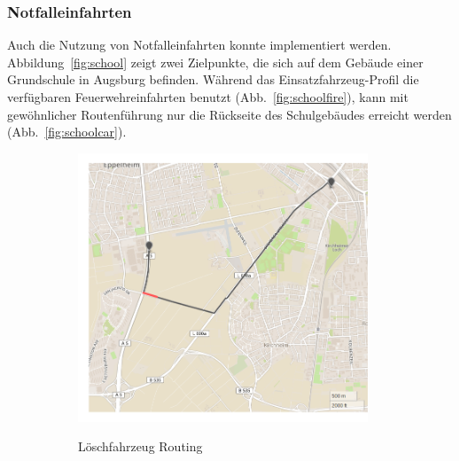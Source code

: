 \subsubsection{Notfalleinfahrten}


Auch die Nutzung von Notfalleinfahrten konnte implementiert werden.
Abbildung~\ref{fig:school} zeigt zwei Zielpunkte, die sich auf dem Gebäude einer Grundschule in Augsburg befinden. 
Während das Einsatzfahrzeug-Profil die verfügbaren Feuerwehreinfahrten benutzt (Abb.~\ref{fig:schoolfire}), kann mit gewöhnlicher Routenführung nur die Rückseite des Schulgebäudes erreicht werden (Abb.~\ref{fig:schoolcar}).

\begin{figure}[htb]
\centering
\begin{subfigure}{0.49\textwidth}
\centering
\includegraphics[width = 0.95\textwidth]{../media/notauffahrt.png} \\
\caption{Löschfahrzeug Routing}
\label{fig:emeramp}
\end{subfigure}
\begin{subfigure}{0.49\textwidth}
\centering

\end{subfigure}
\end{figure}
